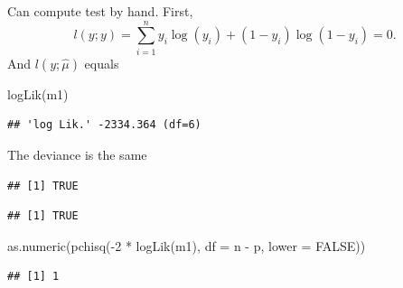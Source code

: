 \documentclass[
  ignorenonframetext,
]{beamer}
\newenvironment{Shaded}{\begin{snugshade}}{\end{snugshade}}
\newcommand{\AttributeTok}[1]{\textcolor[rgb]{0.77,0.63,0.00}{#1}}
\newcommand{\ConstantTok}[1]{\textcolor[rgb]{0.00,0.00,0.00}{#1}}
\newcommand{\DecValTok}[1]{\textcolor[rgb]{0.00,0.00,0.81}{#1}}
\newcommand{\FunctionTok}[1]{\textcolor[rgb]{0.00,0.00,0.00}{#1}}
\newcommand{\NormalTok}[1]{#1}
\newcommand{\OtherTok}[1]{\textcolor[rgb]{0.56,0.35,0.01}{#1}}
\newcommand{\SpecialCharTok}[1]{\textcolor[rgb]{0.00,0.00,0.00}{#1}}
\begin{document}
\begin{frame}[fragile]{}
\protect\hypertarget{section-10}{}
Can compute test by hand. First, \[
l(y;y) = \sum_{i=1}^n y_i\log(y_i) + (1 - y_i)\log(1 - y_i) = 0.
\] And \(l(y; \hat{\mu})\) equals

\begin{Shaded}
\begin{Highlighting}[]
\FunctionTok{logLik}\NormalTok{(m1)}
\end{Highlighting}
\end{Shaded}

\begin{verbatim}
## 'log Lik.' -2334.364 (df=6)
\end{verbatim}

\vspace{12pt}

The deviance is the same \vspace{12pt} \tiny

\begin{Shaded}
\end{Shaded}

\begin{verbatim}
## [1] TRUE
\end{verbatim}

\begin{Shaded}
\end{Shaded}

\begin{verbatim}
## [1] TRUE
\end{verbatim}

\begin{Shaded}
\begin{Highlighting}[]
\FunctionTok{as.numeric}\NormalTok{(}\FunctionTok{pchisq}\NormalTok{(}\SpecialCharTok{{-}}\DecValTok{2} \SpecialCharTok{*} \FunctionTok{logLik}\NormalTok{(m1), }\AttributeTok{df =}\NormalTok{ n }\SpecialCharTok{{-}}\NormalTok{ p, }\AttributeTok{lower =} \ConstantTok{FALSE}\NormalTok{))}
\end{Highlighting}
\end{Shaded}

\begin{verbatim}
## [1] 1
\end{verbatim}
\end{frame}
\end{document}
